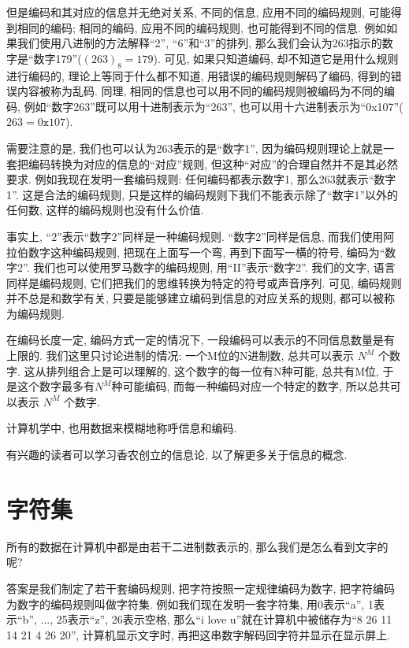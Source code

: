         但是编码和其对应的信息并无绝对关系, 不同的信息, 应用不同的编码规则, 可能得到相同的编码; 相同的编码, 应用不同的编码规则, 也可能得到不同的信息. 例如如果我们使用八进制的方法解释``2'', ``6''和``3''的排列, 那么我们会认为263指示的数字是``数字179''($ (263)_8 = 179 $). 可见, 如果只知道编码, 却不知道它是用什么规则进行编码的, 理论上等同于什么都不知道, 用错误的编码规则解码了编码, 得到的错误内容被称为乱码. 同理, 相同的信息也可以用不同的编码规则被编码为不同的编码, 例如``数字263''既可以用十进制表示为``263'', 也可以用十六进制表示为``0x107''($ 263 = 0\texttt{x}107 $).

        需要注意的是, 我们也可以认为263表示的是``数字1'', 因为编码规则理论上就是一套把编码转换为对应的信息的``对应''规则, 但这种``对应''的合理自然并不是其必然要求. 例如我现在发明一套编码规则: 任何编码都表示数字1, 那么263就表示``数字1''. 这是合法的编码规则, 只是这样的编码规则下我们不能表示除了``数字1''以外的任何数, 这样的编码规则也没有什么价值.

        事实上, ``2''表示``数字2''同样是一种编码规则. ``数字2''同样是信息, 而我们使用阿拉伯数字这种编码规则, 把现在上面写一个弯, 再到下面写一横的符号, 编码为``数字2''. 我们也可以使用罗马数字的编码规则, 用``II''表示``数字2''. 我们的文字, 语言同样是编码规则, 它们把我们的思维转换为特定的符号或声音序列. 可见, 编码规则并不总是和数学有关, 只要是能够建立编码到信息的对应关系的规则, 都可以被称为编码规则.

        在编码长度一定, 编码方式一定的情况下, 一段编码可以表示的不同信息数量是有上限的. 我们这里只讨论进制的情况: 一个M位的N进制数, 总共可以表示 $ N^M $ 个数字. 这从排列组合上是可以理解的, 这个数字的每一位有N种可能, 总共有M位, 于是这个数字最多有$ N^M $种可能编码, 而每一种编码对应一个特定的数字, 所以总共可以表示 $ N^M $ 个数字.

        计算机学中, 也用数据来模糊地称呼信息和编码. 
        
        有兴趣的读者可以学习香农创立的信息论, 以了解更多关于信息的概念.

    \section{字符集} \label{字符集}
        所有的数据在计算机中都是由若干二进制数表示的, 那么我们是怎么看到文字的呢? 

        答案是我们制定了若干套编码规则, 把字符按照一定规律编码为数字, 把字符编码为数字的编码规则叫做字符集. 例如我们现在发明一套字符集, 用0表示``a'', 1表示``b'', ..., 25表示``z'', 26表示空格, 那么``i love u''就在计算机中被储存为``8 26 11 14 21 4 26 20'', 计算机显示文字时, 再把这串数字解码回字符并显示在显示屏上.

